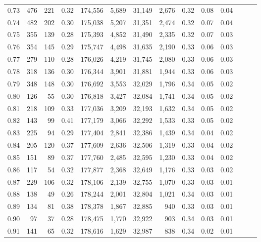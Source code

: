 \begin{tabular}{rrrrrrrrrrrrrr}
0.73 &    476 &  221 &  0.32 &  174,556 &    5,689 &  31,149 &   2,676 &  0.32 &  0.08 &      0.04 \\
0.74 &    482 &  202 &  0.30 &  175,038 &    5,207 &  31,351 &   2,474 &  0.32 &  0.07 &      0.04 \\
0.75 &    355 &  139 &  0.28 &  175,393 &    4,852 &  31,490 &   2,335 &  0.32 &  0.07 &      0.03 \\
0.76 &    354 &  145 &  0.29 &  175,747 &    4,498 &  31,635 &   2,190 &  0.33 &  0.06 &      0.03 \\
0.77 &    279 &  110 &  0.28 &  176,026 &    4,219 &  31,745 &   2,080 &  0.33 &  0.06 &      0.03 \\
0.78 &    318 &  136 &  0.30 &  176,344 &    3,901 &  31,881 &   1,944 &  0.33 &  0.06 &      0.03 \\
0.79 &    348 &  148 &  0.30 &  176,692 &    3,553 &  32,029 &   1,796 &  0.34 &  0.05 &      0.02 \\
0.80 &    126 &   55 &  0.30 &  176,818 &    3,427 &  32,084 &   1,741 &  0.34 &  0.05 &      0.02 \\
0.81 &    218 &  109 &  0.33 &  177,036 &    3,209 &  32,193 &   1,632 &  0.34 &  0.05 &      0.02 \\
0.82 &    143 &   99 &  0.41 &  177,179 &    3,066 &  32,292 &   1,533 &  0.33 &  0.05 &      0.02 \\
0.83 &    225 &   94 &  0.29 &  177,404 &    2,841 &  32,386 &   1,439 &  0.34 &  0.04 &      0.02 \\
0.84 &    205 &  120 &  0.37 &  177,609 &    2,636 &  32,506 &   1,319 &  0.33 &  0.04 &      0.02 \\
0.85 &    151 &   89 &  0.37 &  177,760 &    2,485 &  32,595 &   1,230 &  0.33 &  0.04 &      0.02 \\
0.86 &    117 &   54 &  0.32 &  177,877 &    2,368 &  32,649 &   1,176 &  0.33 &  0.03 &      0.02 \\
0.87 &    229 &  106 &  0.32 &  178,106 &    2,139 &  32,755 &   1,070 &  0.33 &  0.03 &      0.01 \\
0.88 &    138 &   49 &  0.26 &  178,244 &    2,001 &  32,804 &   1,021 &  0.34 &  0.03 &      0.01 \\
0.89 &    134 &   81 &  0.38 &  178,378 &    1,867 &  32,885 &     940 &  0.33 &  0.03 &      0.01 \\
0.90 &     97 &   37 &  0.28 &  178,475 &    1,770 &  32,922 &     903 &  0.34 &  0.03 &      0.01 \\
0.91 &    141 &   65 &  0.32 &  178,616 &    1,629 &  32,987 &     838 &  0.34 &  0.02 &      0.01 \\

\end{tabular}

